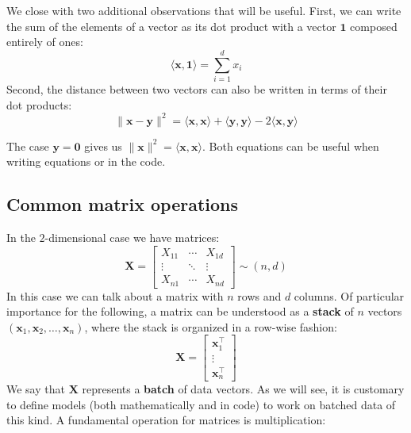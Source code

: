 We close with two additional observations that will be useful. First, we can write the sum of the elements of a vector as its dot product with a vector $\mathbf{1}$ composed entirely of ones:
%
$$
\langle\mathbf{x},\mathbf{1}\rangle=\sum_{i=1}^d x_i
$$
%
Second, the distance between two vectors can also be written in terms of their dot products:
%
$$
\lVert \mathbf{x} -\mathbf{y}\rVert^2 = \langle \mathbf{x},\mathbf{x}\rangle + \langle \mathbf{y},\mathbf{y}\rangle - 2 \langle \mathbf{x},\mathbf{y}\rangle
$$

The case $\mathbf{y}=\mathbf{0}$ gives us $\lVert \mathbf{x} \rVert^2 = \langle \mathbf{x}, \mathbf{x} \rangle$. Both equations can be useful when writing equations or in the code.

\subsection{Common matrix operations}

In the $2$-dimensional case we have matrices:
%
$$
\mathbf{X}=\begin{bmatrix} X_{11} & \cdots & X_{1d} \\ \vdots & \ddots & \vdots \\ X_{n1} & \cdots & X_{nd}\end{bmatrix} \sim (n,d)
$$
%
In this case we can talk about a matrix with $n$ rows and $d$ columns. Of particular importance for the following, a matrix can be understood as a \textbf{stack} of $n$ vectors $(\mathbf{x}_1, \mathbf{x}_2, \ldots, \mathbf{x}_n)$, where the stack is organized in a row-wise fashion:
%
$$
\mathbf{X} = \begin{bmatrix} \mathbf{x}_1^\top \\ \vdots \\ \mathbf{x}_n^\top \end{bmatrix}
$$
%
We say that $\mathbf{X}$ represents a \textbf{batch} of data vectors. As we will see, it is customary to define models (both mathematically and in code) to work on batched data of this kind. A fundamental operation for matrices is multiplication:

